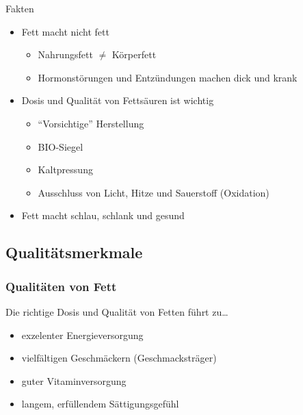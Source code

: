 \documentclass[xcolor=dvipsnames]{beamer}
\begin{document}
\begin{frame}[allowframebreaks]
        \begin{block}{Fakten}
            \begin{itemize}
                \setlength\itemsep{1em}
                \item Fett macht nicht fett
                \begin{itemize}
                    \setlength\itemsep{1em}
                    \item Nahrungsfett $\neq$ Körperfett
                    \item Hormonstörungen und Entzündungen machen dick und krank
                \end{itemize}
                \item Dosis und Qualität von Fettsäuren ist wichtig
                \begin{itemize}
                    \setlength\itemsep{1em}
                    \item "`Vorsichtige"' Herstellung
                    \item BIO-Siegel
                    \item Kaltpressung
                    \item Ausschluss von Licht, Hitze und Sauerstoff (Oxidation)
                \end{itemize}
                \item Fett macht schlau, schlank und gesund
            \end{itemize}
        \end{block}
    \end{frame}

    \subsection{Qualitätsmerkmale}
    \begin{frame}
        \frametitle{Qualitäten von Fett}
        \begin{block}{Die richtige Dosis und Qualität von Fetten führt zu\ldots}
            \begin{itemize}
                \setlength\itemsep{1em}
                \item exzelenter Energieversorgung
                \item vielfältigen Geschmäckern (Geschmacksträger)
                \item guter Vitaminversorgung
                \item langem, erfüllendem Sättigungsgefühl
            \end{itemize}
        \end{block}
    \end{frame}
\end{document}
